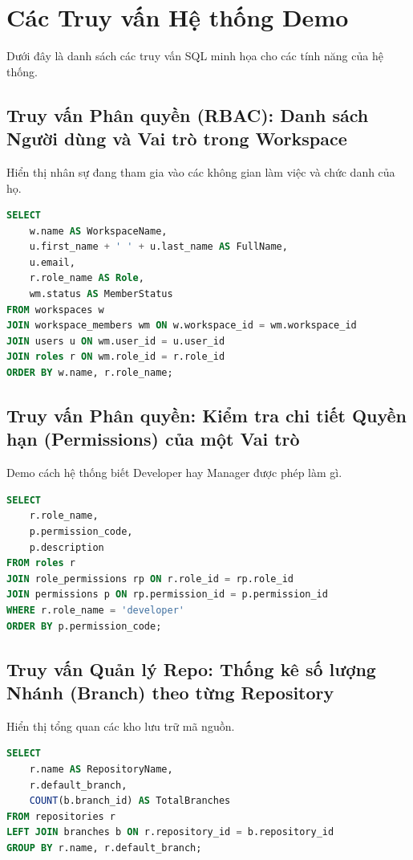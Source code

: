 \chapter{Các Truy vấn Hệ thống Demo}

Dưới đây là danh sách các truy vấn SQL minh họa cho các tính năng của hệ thống.

\section{Truy vấn Phân quyền (RBAC): Danh sách Người dùng và Vai trò trong Workspace}
Hiển thị nhân sự đang tham gia vào các không gian làm việc và chức danh của họ.

\begin{lstlisting}[language=SQL]
SELECT 
    w.name AS WorkspaceName,
    u.first_name + ' ' + u.last_name AS FullName,
    u.email,
    r.role_name AS Role,
    wm.status AS MemberStatus
FROM workspaces w
JOIN workspace_members wm ON w.workspace_id = wm.workspace_id
JOIN users u ON wm.user_id = u.user_id
JOIN roles r ON wm.role_id = r.role_id
ORDER BY w.name, r.role_name;
\end{lstlisting}

\section{Truy vấn Phân quyền: Kiểm tra chi tiết Quyền hạn (Permissions) của một Vai trò}
Demo cách hệ thống biết Developer hay Manager được phép làm gì.

\begin{lstlisting}[language=SQL]
SELECT 
    r.role_name,
    p.permission_code,
    p.description
FROM roles r
JOIN role_permissions rp ON r.role_id = rp.role_id
JOIN permissions p ON rp.permission_id = p.permission_id
WHERE r.role_name = 'developer'
ORDER BY p.permission_code;
\end{lstlisting}

\section{Truy vấn Quản lý Repo: Thống kê số lượng Nhánh (Branch) theo từng Repository}
Hiển thị tổng quan các kho lưu trữ mã nguồn.

\begin{lstlisting}[language=SQL]
SELECT 
    r.name AS RepositoryName,
    r.default_branch,
    COUNT(b.branch_id) AS TotalBranches
FROM repositories r
LEFT JOIN branches b ON r.repository_id = b.repository_id
GROUP BY r.name, r.default_branch;
\end{lstlisting}


